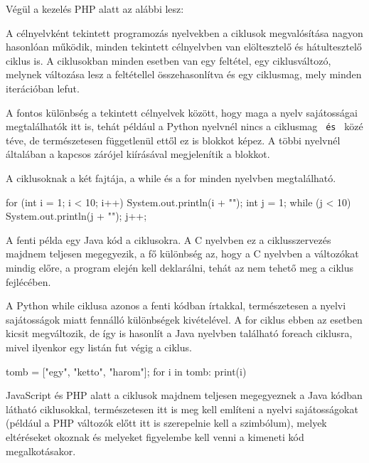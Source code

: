 
Végül a kezelés PHP alatt az alábbi lesz:



A célnyelvként tekintett programozás nyelvekben a ciklusok megvalósítása nagyon hasonlóan működik, minden tekintett célnyelvben van elöltesztelő és hátultesztelő ciklus is. A ciklusokban minden esetben van egy feltétel, egy ciklusváltozó, melynek változása lesz a feltétellel összehasonlítva és egy ciklusmag, mely minden iterációban lefut.

A fontos különbség a tekintett célnyelvek között, hogy maga a nyelv sajátosságai megtalálhatók itt is, tehát például a Python nyelvnél nincs a ciklusmag \texttt{{} és \texttt{}} közé téve, de természetesen függetlenül ettől ez is blokkot képez. A többi nyelvnél általában a kapcsos zárójel kiírásával megjelenítik a blokkot.

A ciklusoknak a két fajtája, a while és a for minden nyelvben megtalálható.
\begin{cpp}
	for (int i = 1; i < 10; i++) {
		System.out.println(i + "\n");
	}
	int j = 1;
	while (j < 10) {
		System.out.println(j + "\n");
		j++;
	}
\end{cpp}
A fenti példa egy Java kód a ciklusokra. A C nyelvben ez a ciklusszervezés majdnem teljesen megegyezik, a fő különbség az, hogy a C nyelvben a változókat mindig előre, a program elején kell deklarálni, tehát az nem tehető meg a ciklus fejlécében.

A Python while ciklusa azonos a fenti kódban írtakkal, természetesen a nyelvi sajátosságok miatt fennálló különbségek kivételével. A for ciklus ebben az esetben kicsit megváltozik, de így is hasonlít a Java nyelvben található foreach ciklusra, mivel ilyenkor egy listán fut végig a ciklus.
\begin{cpp}
	tomb = ["egy", "ketto", "harom"];
	for i in tomb:
		print(i)
\end{cpp}

JavaScript és PHP alatt a ciklusok majdnem teljesen megegyeznek a Java kódban látható ciklusokkal, természetesen itt is meg kell említeni a nyelvi sajátosságokat (például a PHP változók előtt itt is szerepelnie kell a \textdollar szimbólum), melyek eltéréseket okoznak és melyeket figyelembe kell venni a kimeneti kód megalkotásakor.

